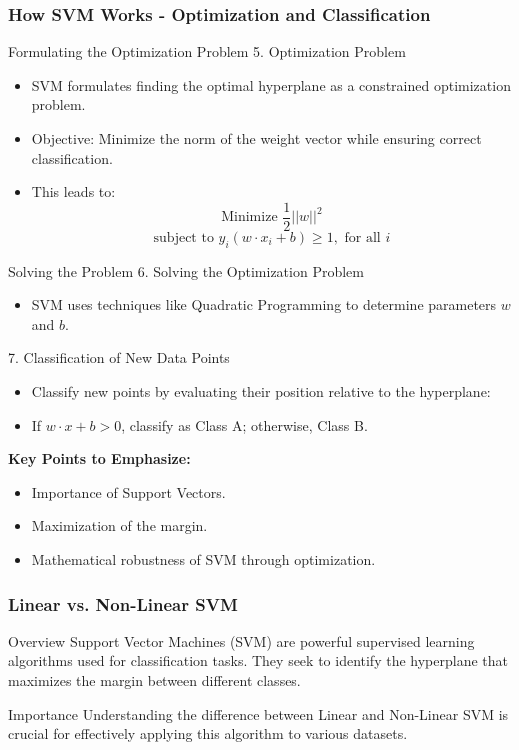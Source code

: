 \documentclass{beamer}
\begin{document}
\begin{frame}[fragile]
    \frametitle{How SVM Works - Optimization and Classification}
    \begin{block}{Formulating the Optimization Problem}
        5. Optimization Problem
        \begin{itemize}
            \item SVM formulates finding the optimal hyperplane as a constrained optimization problem.
            \item Objective: Minimize the norm of the weight vector while ensuring correct classification.
            \item This leads to:
            \[
            \text{Minimize } \frac{1}{2} ||w||^2
            \]
            \[
            \text{subject to } y_i (w \cdot x_i + b) \geq 1, \text{ for all } i
            \]
        \end{itemize}
    \end{block}

    \begin{block}{Solving the Problem}
        6. Solving the Optimization Problem
        \begin{itemize}
            \item SVM uses techniques like Quadratic Programming to determine parameters \( w \) and \( b \).
        \end{itemize}

        7. Classification of New Data Points
        \begin{itemize}
            \item Classify new points by evaluating their position relative to the hyperplane:
            \item If \( w \cdot x + b > 0 \), classify as Class A; otherwise, Class B.
        \end{itemize}
    
        \textbf{Key Points to Emphasize:}
        \begin{itemize}
            \item Importance of Support Vectors.
            \item Maximization of the margin.
            \item Mathematical robustness of SVM through optimization.
        \end{itemize}
    \end{block}
\end{frame}

\begin{frame}[fragile]
    \frametitle{Linear vs. Non-Linear SVM}
    \begin{block}{Overview}
        Support Vector Machines (SVM) are powerful supervised learning algorithms used for classification tasks. 
        They seek to identify the hyperplane that maximizes the margin between different classes.
    \end{block}
    \begin{block}{Importance}
        Understanding the difference between Linear and Non-Linear SVM is crucial for effectively applying this algorithm to various datasets.
    \end{block}
\end{frame}
\end{document}

